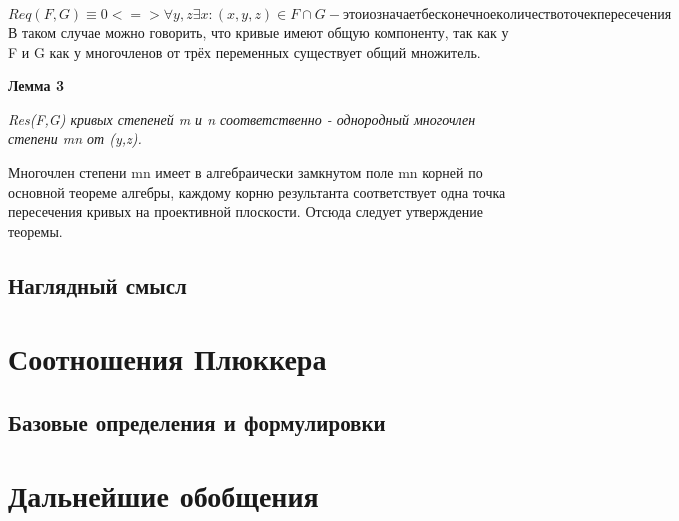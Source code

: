 \documentclass[a4paper, 12pt]{article}
\begin{document}
$Req(F,G) \equiv 0 <=> \forall y,z \exists x: (x,y,z) \in F \cap G - это и означает бесконечное количество точек пересечения$
В таком случае можно говорить, что кривые имеют общую компоненту, так как у F и G как у многочленов от трёх переменных существует общий множитель. %

\textbf{Лемма 3}

\textit{Res(F,G) кривых степеней m и n соответственно - однородный многочлен степени mn от (y,z).}


Многочлен степени mn имеет в алгебраически замкнутом поле mn корней по основной теореме алгебры, каждому корню результанта соответствует одна точка пересечения кривых на проективной плоскости.
Отсюда следует утверждение теоремы.

\subsection{Наглядный смысл} %

\section{Соотношения Плюккера}
\subsection{Базовые определения и формулировки}
\section{Дальнейшие обобщения}
\end{document}
